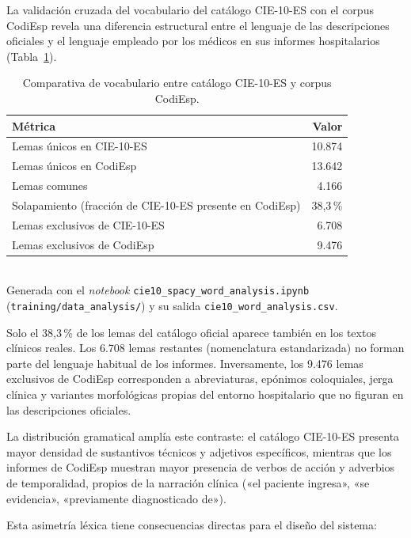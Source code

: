 La validación cruzada del vocabulario del catálogo CIE-10-ES con el corpus CodiEsp revela una diferencia estructural entre el lenguaje de las descripciones oficiales y el lenguaje empleado por los médicos en sus informes hospitalarios (Tabla~\ref{tab:vocab-gap}).

\begin{table}[h]
\centering
\caption{Comparativa de vocabulario entre catálogo CIE-10-ES y corpus CodiEsp.}
\label{tab:vocab-gap}
\begin{tabular}{lr}
\hline
\textbf{Métrica} & \textbf{Valor} \\
\hline
Lemas únicos en CIE-10-ES & 10.874 \\
Lemas únicos en CodiEsp & 13.642 \\
Lemas comunes & 4.166 \\
Solapamiento (fracción de CIE-10-ES presente en CodiEsp) & 38{,}3\,\% \\
Lemas exclusivos de CIE-10-ES & 6.708 \\
Lemas exclusivos de CodiEsp & 9.476 \\
\hline
\end{tabular}
\\[4pt]
{\footnotesize Generada con el \emph{notebook} \texttt{cie10\_\allowbreak{}spacy\_\allowbreak{}word\_\allowbreak{}analysis.ipynb} (\texttt{training/\allowbreak{}data\_analysis/}) y su salida \texttt{cie10\_\allowbreak{}word\_\allowbreak{}analysis.csv}.}
\end{table}

Solo el 38,3\,\% de los lemas del catálogo oficial aparece también en los textos clínicos reales. Los 6.708 lemas restantes (nomenclatura estandarizada) no forman parte del lenguaje habitual de los informes. Inversamente, los 9.476 lemas exclusivos de CodiEsp corresponden a abreviaturas, epónimos coloquiales, jerga clínica y variantes morfológicas propias del entorno hospitalario que no figuran en las descripciones oficiales.

La distribución gramatical amplía este contraste: el catálogo CIE-10-ES presenta mayor densidad de sustantivos técnicos y adjetivos específicos, mientras que los informes de CodiEsp muestran mayor presencia de verbos de acción y adverbios de temporalidad, propios de la narración clínica («el paciente ingresa», «se evidencia», «previamente diagnosticado de»).

Esta asimetría léxica tiene consecuencias directas para el diseño del sistema:

